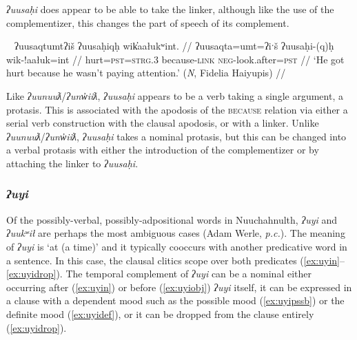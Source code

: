 \textit{ʔuusaḥi} does appear to be able to take the linker, although like the use of the complementizer, this changes the part of speech of its complement.

\ex~ \label{ex:uusahiqh}
\begingl
\glpreamble ʔuusaqtumtʔiš ʔuusaḥiqḥ wik̓aałukʷint. //
\gla ʔuusaqta=umt=ʔiˑš ʔuusaḥi-(q)ḥ wik-!aałuk=int //
\glb hurt=\textsc{pst}=\textsc{strg.3} because-\textsc{link} \textsc{neg}-look.after=\textsc{pst}  //
\glft `He got hurt because he wasn't paying attention.' (\textit{N}, Fidelia Haiyupis) //
\endgl
\xe


Like \textit{ʔuunuuƛ}/\textit{ʔunw̓iiƛ}, \textit{ʔuusaḥi} appears to be a verb taking a single argument, a protasis. This is associated with the apodosis of the \textsc{because} relation via either a serial verb construction with the clausal apodosis, or with a linker. Unlike \textit{ʔuunuuƛ}/\textit{ʔunw̓iiƛ}, \textit{ʔuusaḥi} takes a nominal protasis, but this can be changed into a verbal protasis with either the introduction of the complementizer or by attaching the linker to \textit{ʔuusaḥi}.

\subsubsection{\textit{ʔuyi}} \label{sec:link:uyi}

Of the possibly-verbal, possibly-adpositional words in Nuuchahnulth, \textit{ʔuyi} and \textit{ʔuukʷił} are perhaps the most ambiguous cases (Adam Werle, \textit{p.c.}). The meaning of \textit{ʔuyi} is `at (a time)' and it typically cooccurs with another predicative word in a sentence. In this case, the clausal clitics scope over both predicates (\ref{ex:uyin}--\ref{ex:uyidrop}). The temporal complement of \textit{ʔuyi} can be a nominal either occurring after (\ref{ex:uyin}) or before (\ref{ex:uyiobj}) \textit{ʔuyi} itself, it can be expressed in a clause with a dependent mood such as the possible mood (\ref{ex:uyipssb}) or the definite mood (\ref{ex:uyidef}), or it can be dropped from the clause entirely (\ref{ex:uyidrop}).

